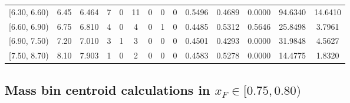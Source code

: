 \begin{table}[htbp]
{\begin{tabular}{cc|c|cccccc|ccc|cc}
        {[6.30, 6.60)} & 6.45 & 6.464 & 7 & 0 & 11 & 0 & 0 & 0 & 0.5496 & 0.4689 & 0.0000 & 94.6340 & 14.6410 \\
        {[6.60, 6.90)} & 6.75 & 6.810 & 4 & 0 & 4 & 0 & 1 & 0 & 0.4485 & 0.5312 & 0.5646 & 25.8498 & 3.7961 \\
        {[6.90, 7.50)} & 7.20 & 7.010 & 3 & 1 & 3 & 0 & 0 & 0 & 0.4501 & 0.4293 & 0.0000 & 31.9848 & 4.5627 \\
        {[7.50, 8.70)} & 8.10 & 7.903 & 1 & 0 & 2 & 0 & 0 & 0 & 0.4583 & 0.5278 & 0.0000 & 14.4775 & 1.8320 \\
        \hline\hline
    \end{tabular}
    }
\end{table}

\clearpage
\subsection{\texorpdfstring{Mass bin centroid calculations in $x_F \in [0.75, 0.80)$}{Mass bin centroid calculations in x\_F in [0.75, 0.80)]}}

